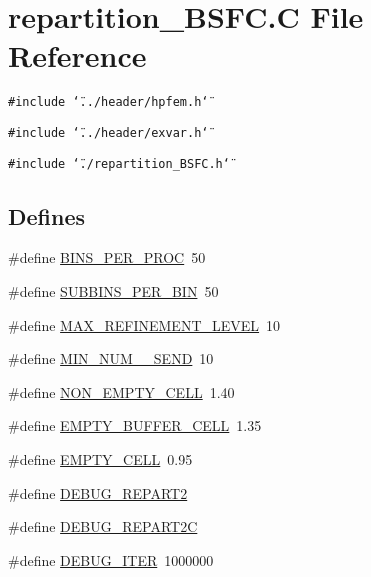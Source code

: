 \hypertarget{repartition__BSFC_8C}{
\section{repartition\_\-BSFC.C File Reference}
\label{repartition__BSFC_8C}
}
{\tt \#include \char`\"{}../header/hpfem.h\char`\"{}}\par
{\tt \#include \char`\"{}../header/exvar.h\char`\"{}}\par
{\tt \#include \char`\"{}./repartition\_\-BSFC.h\char`\"{}}\par
\subsection*{Defines}
\begin{CompactItemize}
\item 
\#define \hyperlink{repartition__BSFC_8C_a0}{BINS\_\-PER\_\-PROC}\ 50
\item 
\#define \hyperlink{repartition__BSFC_8C_a1}{SUBBINS\_\-PER\_\-BIN}\ 50
\item 
\#define \hyperlink{repartition__BSFC_8C_a2}{MAX\_\-REFINEMENT\_\-LEVEL}\ 10
\item 
\#define \hyperlink{repartition__BSFC_8C_a3}{MIN\_\-NUM\_\_\-SEND}\ 10
\item 
\#define \hyperlink{repartition__BSFC_8C_a4}{NON\_\-EMPTY\_\-CELL}\ 1.40
\item 
\#define \hyperlink{repartition__BSFC_8C_a5}{EMPTY\_\-BUFFER\_\-CELL}\ 1.35
\item 
\#define \hyperlink{repartition__BSFC_8C_a6}{EMPTY\_\-CELL}\ 0.95
\item 
\#define \hyperlink{repartition__BSFC_8C_a7}{DEBUG\_\-REPART2}
\item 
\#define \hyperlink{repartition__BSFC_8C_a8}{DEBUG\_\-REPART2C}
\item 
\#define \hyperlink{repartition__BSFC_8C_a9}{DEBUG\_\-ITER}\ 1000000
\end{CompactItemize}
